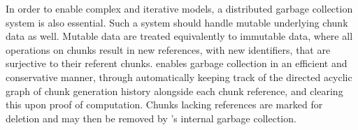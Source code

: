 In order to enable complex and iterative models, a distributed garbage collection system is also essential.
Such a system should handle mutable underlying chunk data as well.
Mutable data are treated equivalently to immutable data, where all operations on chunks result in new references, with new identifiers, that are surjective to their referent chunks.
\lsr{} enables garbage collection in an efficient and conservative manner, through automatically keeping track of the directed acyclic graph of chunk generation history alongside each chunk reference, and clearing this upon proof of computation.
Chunks lacking references are marked for deletion and may then be removed by \R{}'s internal garbage collection.

